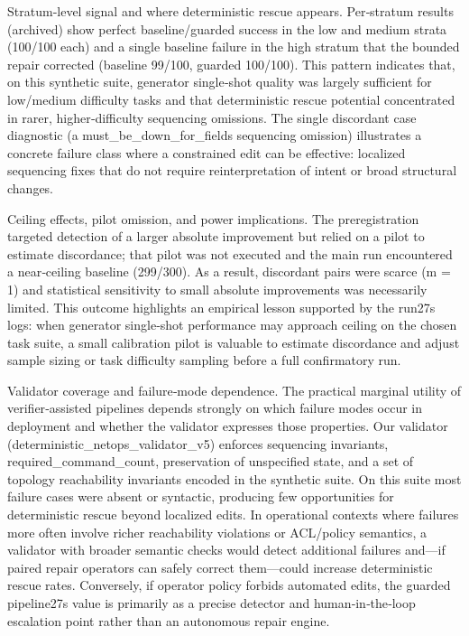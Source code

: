 \documentclass[conference]{IEEEtran}
\begin{document}
Stratum‑level signal and where deterministic rescue appears. Per‑stratum results (archived) show perfect baseline/guarded success in the low and medium strata (100/100 each) and a single baseline failure in the high stratum that the bounded repair corrected (baseline 99/100, guarded 100/100). This pattern indicates that, on this synthetic suite, generator single‑shot quality was largely sufficient for low/medium difficulty tasks and that deterministic rescue potential concentrated in rarer, higher‑difficulty sequencing omissions. The single discordant case diagnostic (a must\_be\_down\_for\_fields sequencing omission) illustrates a concrete failure class where a constrained edit can be effective: localized sequencing fixes that do not require reinterpretation of intent or broad structural changes.

Ceiling effects, pilot omission, and power implications. The preregistration targeted detection of a larger absolute improvement but relied on a pilot to estimate discordance; that pilot was not executed and the main run encountered a near‑ceiling baseline (299/300). As a result, discordant pairs were scarce (m = 1) and statistical sensitivity to small absolute improvements was necessarily limited. This outcome highlights an empirical lesson supported by the run 27s logs: when generator single‑shot performance may approach ceiling on the chosen task suite, a small calibration pilot is valuable to estimate discordance and adjust sample sizing or task difficulty sampling before a full confirmatory run.

Validator coverage and failure‑mode dependence. The practical marginal utility of verifier‑assisted pipelines depends strongly on which failure modes occur in deployment and whether the validator expresses those properties. Our validator (deterministic\_netops\_validator\_v5) enforces sequencing invariants, required\_command\_count, preservation of unspecified state, and a set of topology reachability invariants encoded in the synthetic suite. On this suite most failure cases were absent or syntactic, producing few opportunities for deterministic rescue beyond localized edits. In operational contexts where failures more often involve richer reachability violations or ACL/policy semantics, a validator with broader semantic checks would detect additional failures and---if paired repair operators can safely correct them---could increase deterministic rescue rates. Conversely, if operator policy forbids automated edits, the guarded pipeline 27s value is primarily as a precise detector and human‑in‑the‑loop escalation point rather than an autonomous repair engine.
\end{document}
